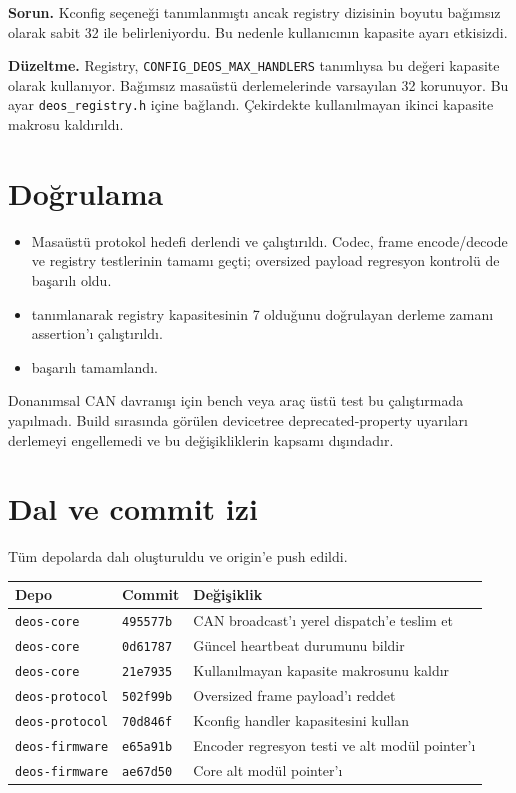\documentclass[a4paper,11pt]{article}
\begin{document}
\textbf{Sorun.}  Kconfig seçeneği
tanımlanmıştı ancak registry dizisinin boyutu bağımsız olarak sabit 32 ile
belirleniyordu. Bu nedenle kullanıcının kapasite ayarı etkisizdi.

\textbf{Düzeltme.} Registry, \texttt{CONFIG\_DEOS\_MAX\_HANDLERS}
tanımlıysa bu değeri kapasite olarak kullanıyor. Bağımsız masaüstü
derlemelerinde varsayılan 32 korunuyor. Bu ayar \texttt{deos\_registry.h}
içine bağlandı.
Çekirdekte kullanılmayan ikinci kapasite makrosu kaldırıldı.

\section{Doğrulama}

\begin{itemize}
    \item Masaüstü protokol hedefi derlendi ve 
    çalıştırıldı. Codec, frame encode/decode ve registry testlerinin tamamı geçti;
    oversized payload regresyon kontrolü de başarılı oldu.
    \item {} tanımlanarak registry
    kapasitesinin 7 olduğunu doğrulayan derleme zamanı assertion’ı çalıştırıldı.
    \item {} başarılı
    tamamlandı.
\end{itemize}

Donanımsal CAN davranışı için bench veya araç üstü test bu çalıştırmada
yapılmadı. Build sırasında görülen devicetree deprecated-property uyarıları
derlemeyi engellemedi ve bu değişikliklerin kapsamı dışındadır.

\section{Dal ve commit izi}

Tüm depolarda  dalı oluşturuldu ve origin’e
push edildi.

\begin{tabularx}{\textwidth}{p{3.2cm}p{2.1cm}Y}
\toprule
\textbf{Depo} & \textbf{Commit} & \textbf{Değişiklik} \\
\midrule
\texttt{deos-core} & \texttt{495577b} & CAN broadcast’ı yerel dispatch’e teslim et \\
\texttt{deos-core} & \texttt{0d61787} & Güncel heartbeat durumunu bildir \\
\texttt{deos-core} & \texttt{21e7935} & Kullanılmayan kapasite makrosunu kaldır \\
\texttt{deos-protocol} & \texttt{502f99b} & Oversized frame payload’ı reddet \\
\texttt{deos-protocol} & \texttt{70d846f} & Kconfig handler kapasitesini kullan \\
\texttt{deos-firmware} & \texttt{e65a91b} & Encoder regresyon testi ve alt modül pointer’ı \\
\texttt{deos-firmware} & \texttt{ae67d50} & Core alt modül pointer’ı \\
\bottomrule
\end{tabularx}
\end{document}
